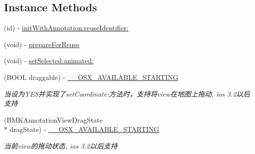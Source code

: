 \subsection*{Instance Methods}
\begin{DoxyCompactItemize}
\item 
(id) -\/ \hyperlink{interface_b_m_k_annotation_view_ae2b46541ec52b7d8ee0857a9ec369f5f}{init\+With\+Annotation\+:reuse\+Identifier\+:}
\item 
(void) -\/ \hyperlink{interface_b_m_k_annotation_view_ae74849e624ac0cfaa7695b7cc97ddf23}{prepare\+For\+Reuse}
\item 
(void) -\/ \hyperlink{interface_b_m_k_annotation_view_abc0e70812fb7b3bccdbb574ddb578c21}{set\+Selected\+:animated\+:}
\item 
\hypertarget{interface_b_m_k_annotation_view_a54d15e7cc4e89d89d2233ec7fc408ad9}{(B\+O\+O\+L draggable) -\/ \hyperlink{interface_b_m_k_annotation_view_a54d15e7cc4e89d89d2233ec7fc408ad9}{\+\_\+\+\_\+\+O\+S\+X\+\_\+\+A\+V\+A\+I\+L\+A\+B\+L\+E\+\_\+\+S\+T\+A\+R\+T\+I\+N\+G}}\label{interface_b_m_k_annotation_view_a54d15e7cc4e89d89d2233ec7fc408ad9}

\begin{DoxyCompactList}\small\item\em 当设为\+Y\+E\+S并实现了set\+Coordinate\+:方法时，支持将view在地图上拖动, ios 3.\+2以后支持 \end{DoxyCompactList}\item 
\hypertarget{interface_b_m_k_annotation_view_a623e818d48c983176a6553104b21a34c}{(B\+M\+K\+Annotation\+View\+Drag\+State \\*
drag\+State) -\/ \hyperlink{interface_b_m_k_annotation_view_a623e818d48c983176a6553104b21a34c}{\+\_\+\+\_\+\+O\+S\+X\+\_\+\+A\+V\+A\+I\+L\+A\+B\+L\+E\+\_\+\+S\+T\+A\+R\+T\+I\+N\+G}}\label{interface_b_m_k_annotation_view_a623e818d48c983176a6553104b21a34c}

\begin{DoxyCompactList}\small\item\em 当前view的拖动状态, ios 3.\+2以后支持 \end{DoxyCompactList}\end{DoxyCompactItemize}
